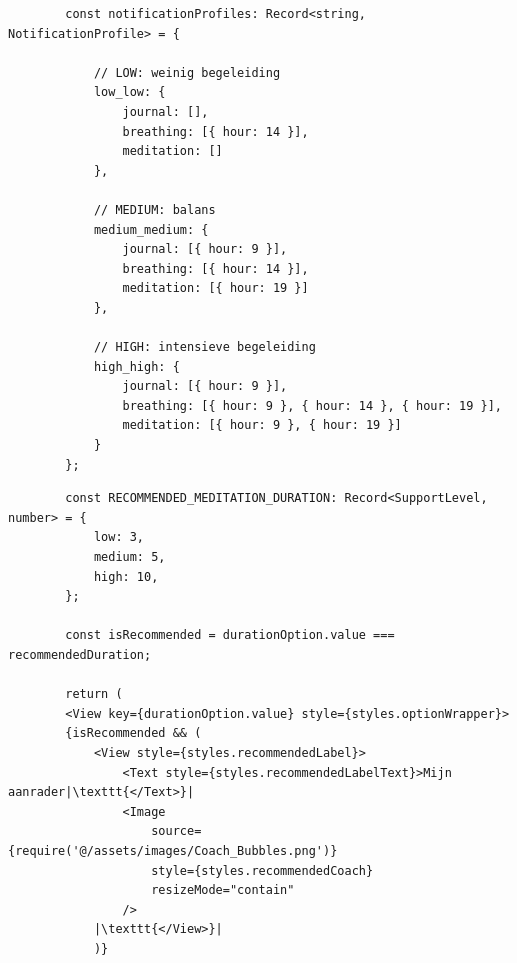 \begin{listing}[H]
    \begin{verbatim}
        const notificationProfiles: Record<string, NotificationProfile> = {
            
            // LOW: weinig begeleiding
            low_low: { 
                journal: [], 
                breathing: [{ hour: 14 }], 
                meditation: [] 
            },
            
            // MEDIUM: balans
            medium_medium: { 
                journal: [{ hour: 9 }], 
                breathing: [{ hour: 14 }], 
                meditation: [{ hour: 19 }] 
            },
            
            // HIGH: intensieve begeleiding
            high_high: {
                journal: [{ hour: 9 }],
                breathing: [{ hour: 9 }, { hour: 14 }, { hour: 19 }],
                meditation: [{ hour: 9 }, { hour: 19 }]
            }
        };
    \end{verbatim}
    \caption[Vooraf gedefinieerde notificatieprofielen]
    {Vooraf gedefinieerde notificatieprofielen met verschillende ondersteuningsintensiteiten.}
    \label{lst:notification-profiles}
\end{listing}

\begin{listing}[H]
    \begin{verbatim}
        const RECOMMENDED_MEDITATION_DURATION: Record<SupportLevel, number> = {
            low: 3,
            medium: 5,
            high: 10,
        };
        
        const isRecommended = durationOption.value === recommendedDuration;
        
        return (
        <View key={durationOption.value} style={styles.optionWrapper}>
        {isRecommended && (
            <View style={styles.recommendedLabel}>
                <Text style={styles.recommendedLabelText}>Mijn aanrader|\texttt{</Text>}|
                <Image
                    source={require('@/assets/images/Coach_Bubbles.png')}
                    style={styles.recommendedCoach}
                    resizeMode="contain"
                />
            |\texttt{</View>}|
            )}
    \end{verbatim}
    \caption[Aanbevolen meditatieduur]
    {Aanbevolen meditatieduur afgestemd op de gekozen begeleidingsintensiteit.}
    \label{lst:recommended-meditation-duration}
\end{listing}

